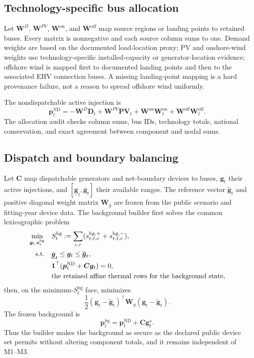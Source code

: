 \documentclass[10pt,journal,onecolumn]{IEEEtran}
\newcommand{\one}{\mathbf{1}}
\begin{document}
\subsection{Technology-specific bus allocation}

Let $\bm W^D$, $\bm W^{PV}$, $\bm W^{\mathrm{on}}$, and
$\bm W^{\mathrm{off}}$ map source regions or landing points to retained buses.
Every matrix is nonnegative and each source column sums to one. Demand weights
are based on the documented load-location proxy; PV and onshore-wind weights
use technology-specific installed-capacity or generator-location evidence;
offshore wind is mapped first to documented landing points and then to the
associated EHV connection buses. A missing landing-point mapping is a hard
provenance failure, not a reason to spread offshore wind uniformly.

The nondispatchable active injection is
\begin{equation}
\bm p_t^{\mathrm{ND}}
=-\bm W^D\bm D_t
+\bm W^{PV}\bm{PV}_t
+\bm W^{\mathrm{on}}\bm W_t^{\mathrm{on}}
+\bm W^{\mathrm{off}}\bm W_t^{\mathrm{off}}.
\label{eq:report_pND}
\end{equation}
The allocation audit checks column sums, bus IDs, technology totals, national
conservation, and exact agreement between component and nodal sums.

\subsection{Dispatch and boundary balancing}

Let $\bm C$ map dispatchable generators and net-boundary devices to buses,
$\bm g_t$ their active injections, and
$[\underline{\bm g}_t,\overline{\bm g}_t]$ their available ranges. The
reference vector $\widetilde{\bm g}_t$ and positive diagonal weight matrix
$\bm W_g$ are frozen from the public scenario and fitting-year device data.
The background builder first solves the common lexicographic problem
\begin{align}
\min_{\bm g_t,\bm s_t^{\mathrm{bg}}}\quad
&S_t^{\mathrm{bg}}
:=\sum_{c,r}(s_{r,t,c}^{\mathrm{bg},+}
+s_{r,t,c}^{\mathrm{bg},-}),
\label{eq:report_bg_stage1}\\
\mathrm{s.t.}\quad
&\underline{\bm g}_t\leq\bm g_t\leq\overline{\bm g}_t,
\notag\\
&\one^\top(\bm p_t^{\mathrm{ND}}+\bm C\bm g_t)=0,
\notag\\
&\text{the retained affine thermal rows for the background state},
\notag
\end{align}
then, on the minimum-$S_t^{\mathrm{bg}}$ face, minimizes
\begin{equation}
\frac12(\bm g_t-\widetilde{\bm g}_t)^\top
\bm W_g(\bm g_t-\widetilde{\bm g}_t).
\label{eq:report_bg_stage2}
\end{equation}
The frozen background is
\begin{equation}
\bm p_t^{\mathrm{bg}}
=\bm p_t^{\mathrm{ND}}+\bm C\bm g_t^{\star}.
\end{equation}
Thus the builder makes the background as secure as the declared public device
set permits without altering component totals, and it remains independent of
M1--M3.
\end{document}
